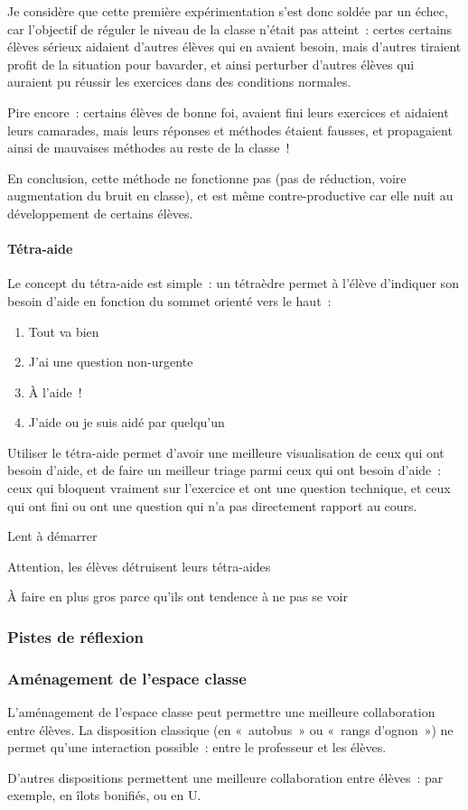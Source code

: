 Je considère que cette première expérimentation s'est donc soldée par un échec, car
l'objectif de réguler le niveau de la classe n'était pas atteint : certes certains
élèves sérieux aidaient d'autres élèves qui en avaient besoin, mais d'autres tiraient
profit de la situation pour bavarder, et ainsi perturber d'autres élèves qui
auraient pu réussir les exercices dans des conditions normales.

Pire encore : certains élèves de bonne foi, avaient fini leurs exercices et aidaient
leurs camarades, mais leurs réponses et méthodes étaient fausses, et propagaient
ainsi de mauvaises méthodes au reste de la classe !

En conclusion, cette méthode ne fonctionne pas (pas de réduction, voire augmentation
du bruit en classe), et est même contre-productive car elle nuit au développement
de certains élèves.

\paragraph{Tétra-aide}

Le concept du tétra-aide est simple : un tétraèdre permet à l'élève d'indiquer
son besoin d'aide en fonction du sommet orienté vers le haut :
\begin{enumerate}
    \item Tout va bien
    \item J'ai une question non-urgente
    \item À l'aide !
    \item J'aide ou je suis aidé par quelqu'un
\end{enumerate}

Utiliser le tétra-aide permet d'avoir une meilleure visualisation de ceux qui ont
besoin d'aide, et de faire un meilleur triage parmi ceux qui ont besoin d'aide :
ceux qui bloquent vraiment sur l'exercice et ont une question technique, et ceux
qui ont fini ou ont une question qui n'a pas directement rapport au cours.

Lent à démarrer

Attention, les élèves détruisent leurs tétra-aides

À faire en plus gros parce qu'ils ont tendence à ne pas se voir

\subsubsection{Pistes de réflexion}

\subsubsection{Aménagement de l'espace classe}

L'aménagement de l'espace classe peut permettre une meilleure collaboration entre
élèves. La disposition classique (en « autobus » ou « rangs d'ognon ») ne permet
qu'une interaction possible : entre le professeur et les élèves.

D'autres dispositions permettent une meilleure collaboration entre élèves : par
exemple, en îlots bonifiés\cite{ilots_bonifies}, ou en U\cite{amenagement_classe}.
